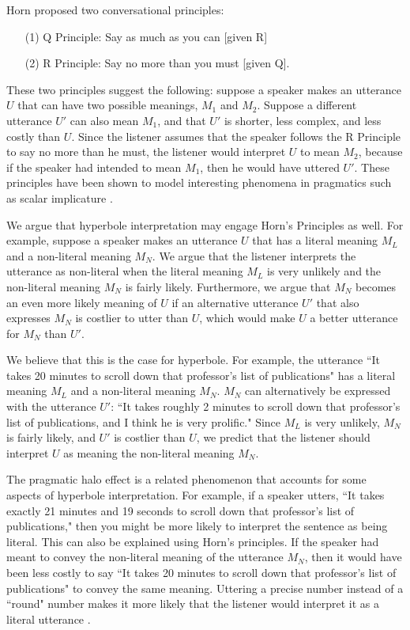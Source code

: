 \documentclass{article} %
\begin{document}
Horn proposed two conversational principles: 
\begin{itemize}
\item[(1)] Q Principle: Say as much as you can [given R]
\item[(2)] R Principle: Say no more than you must [given Q].
\end{itemize}
These two principles suggest the following: suppose a speaker makes an utterance $U$ that can have two possible meanings, $M_1$ and $M_2$. Suppose a different utterance $U'$ can also mean $M_1$, and that $U'$ is shorter, less complex, and less costly than $U$. Since the listener assumes that the speaker follows the R Principle to say no more than he must, the listener would interpret $U$ to mean $M_2$, because if the speaker had intended to mean $M_1$, then he would have uttered $U'$. These principles have been shown to model interesting phenomena in pragmatics such as scalar implicature \cite{bergen2012, stiller2011ad}. 

We argue that hyperbole interpretation may engage Horn's Principles as well. For example, suppose a speaker makes an utterance $U$ that has a literal meaning $M_L$ and a non-literal meaning $M_N$. We argue that the listener interprets the utterance as non-literal when the literal meaning $M_L$ is very unlikely and the non-literal meaning $M_N$ is fairly likely. Furthermore, we argue that $M_N$ becomes an even more likely meaning of $U$ if an alternative utterance $U'$ that also expresses $M_N$ is costlier to utter than $U$, which would make $U$ a better utterance for $M_N$ than $U'$. 

We believe that this is the case for hyperbole. For example, the utterance ``It takes 20 minutes to scroll down that professor's list of publications" has a literal meaning $M_L$ and a non-literal meaning $M_N$. $M_N$ can alternatively be expressed with the utterance $U'$: ``It takes roughly 2 minutes to scroll down that professor's list of publications, and I think he is very prolific." Since $M_L$ is very unlikely, $M_N$ is fairly likely, and $U'$ is costlier than $U$, we predict that the listener should interpret $U$ as meaning the non-literal meaning $M_N$.

The pragmatic halo effect is a related phenomenon that accounts for some aspects of hyperbole interpretation. For example, if a speaker utters, ``It takes exactly 21 minutes and 19 seconds to scroll down that professor's list of publications," then you might be more likely to interpret the sentence as being literal. This can also be explained using Horn's principles. If the speaker had meant to convey the non-literal meaning of the utterance $M_N$, then it would have been less costly to say ``It takes 20 minutes to scroll down that professor's list of publications" to convey the same meaning. Uttering a precise number instead of a ``round" number makes it more likely that the listener would interpret it as a literal utterance \cite{bastiaanse2011rationality}. 
\end{document}
